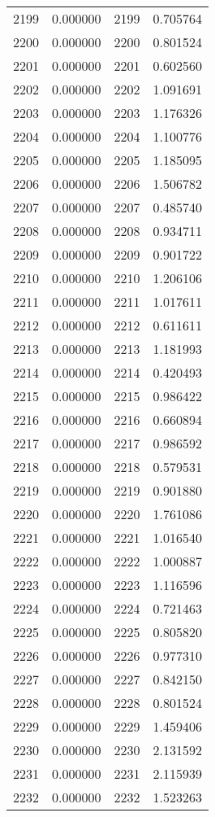 \documentclass[12pt]{article}
\begin{document}
\begin{longtable}{@{}cccc@{}}
2199 & 0.000000 & 2199 & 0.705764 \\
2200 & 0.000000 & 2200 & 0.801524 \\
2201 & 0.000000 & 2201 & 0.602560 \\
2202 & 0.000000 & 2202 & 1.091691 \\
2203 & 0.000000 & 2203 & 1.176326 \\
2204 & 0.000000 & 2204 & 1.100776 \\
2205 & 0.000000 & 2205 & 1.185095 \\
2206 & 0.000000 & 2206 & 1.506782 \\
2207 & 0.000000 & 2207 & 0.485740 \\
2208 & 0.000000 & 2208 & 0.934711 \\
2209 & 0.000000 & 2209 & 0.901722 \\
2210 & 0.000000 & 2210 & 1.206106 \\
2211 & 0.000000 & 2211 & 1.017611 \\
2212 & 0.000000 & 2212 & 0.611611 \\
2213 & 0.000000 & 2213 & 1.181993 \\
2214 & 0.000000 & 2214 & 0.420493 \\
2215 & 0.000000 & 2215 & 0.986422 \\
2216 & 0.000000 & 2216 & 0.660894 \\
2217 & 0.000000 & 2217 & 0.986592 \\
2218 & 0.000000 & 2218 & 0.579531 \\
2219 & 0.000000 & 2219 & 0.901880 \\
2220 & 0.000000 & 2220 & 1.761086 \\
2221 & 0.000000 & 2221 & 1.016540 \\
2222 & 0.000000 & 2222 & 1.000887 \\
2223 & 0.000000 & 2223 & 1.116596 \\
2224 & 0.000000 & 2224 & 0.721463 \\
2225 & 0.000000 & 2225 & 0.805820 \\
2226 & 0.000000 & 2226 & 0.977310 \\
2227 & 0.000000 & 2227 & 0.842150 \\
2228 & 0.000000 & 2228 & 0.801524 \\
2229 & 0.000000 & 2229 & 1.459406 \\
2230 & 0.000000 & 2230 & 2.131592 \\
2231 & 0.000000 & 2231 & 2.115939 \\
2232 & 0.000000 & 2232 & 1.523263 \\

\end{longtable}
\end{document}
